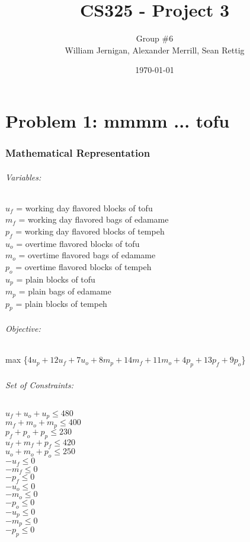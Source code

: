 \documentclass{article}
\title{CS325 - Project 3}
\author{Group \#6 \\ William Jernigan, Alexander Merrill, Sean Rettig}
\date{\today}
\begin{document}
\maketitle

\part*{Problem 1: mmmm ... tofu}
\section*{Mathematical Representation}
\paragraph*{Variables:\\}
$u_f$ = working day flavored blocks of tofu\\
$m_f$ = working day flavored bags of edamame\\
$p_f$ = working day flavored blocks of tempeh\\
$u_o$ = overtime flavored blocks of tofu\\
$m_o$ = overtime flavored bags of edamame\\
$p_o$ = overtime flavored blocks of tempeh\\
$u_p$ = plain blocks of tofu\\
$m_p$ = plain bags of edamame\\
$p_p$ = plain blocks of tempeh\\

\paragraph*{Objective:}
max \{$4u_p + 12u_f + 7u_o + 8m_p + 14m_f + 11m_o + 4p_p + 13p_f + 9p_o$\}
\paragraph*{Set of Constraints:\\}
$u_f + u_o + u_p \leq 480$\\ %
$m_f + m_o + m_p \leq 400$\\ %
$p_f + p_o + p_p \leq 230$\\ %
$u_f + m_f + p_f \leq 420$\\ %
$u_o + m_o + p_o \leq 250$\\ %
$-u_f \leq 0$\\
$-m_f \leq 0$\\
$-p_f \leq 0$\\
$-u_o \leq 0$\\
$-m_o \leq 0$\\
$-p_o \leq 0$\\
$-u_p \leq 0$\\
$-m_p \leq 0$\\
$-p_p \leq 0$\\
\end{document}
